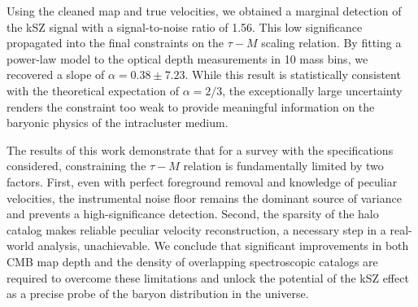 \documentclass[]{article}
\begin{document}
Using the cleaned map and true velocities, we obtained a marginal detection of the kSZ signal with a signal-to-noise ratio of 1.56. This low significance propagated into the final constraints on the $\tau-M$ scaling relation. By fitting a power-law model to the optical depth measurements in 10 mass bins, we recovered a slope of $\alpha = 0.38 \pm 7.23$. While this result is statistically consistent with the theoretical expectation of $\alpha = 2/3$, the exceptionally large uncertainty renders the constraint too weak to provide meaningful information on the baryonic physics of the intracluster medium.

The results of this work demonstrate that for a survey with the specifications considered, constraining the $\tau-M$ relation is fundamentally limited by two factors. First, even with perfect foreground removal and knowledge of peculiar velocities, the instrumental noise floor remains the dominant source of variance and prevents a high-significance detection. Second, the sparsity of the halo catalog makes reliable peculiar velocity reconstruction, a necessary step in a real-world analysis, unachievable. We conclude that significant improvements in both CMB map depth and the density of overlapping spectroscopic catalogs are required to overcome these limitations and unlock the potential of the kSZ effect as a precise probe of the baryon distribution in the universe.


{}

\end{document}
